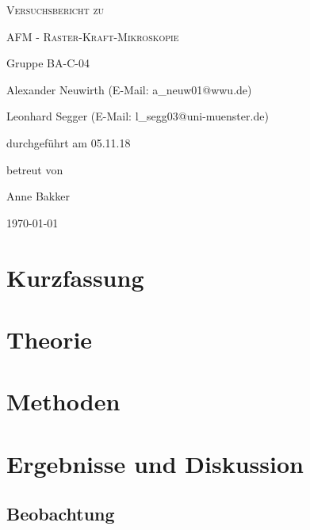 \documentclass[
	a4paper,
	12pt,
	pagesize,
	ngerman
]{scrartcl}
\begin{document}
	\begin{titlepage}
		\centering
		{\scshape\LARGE Versuchsbericht zu \par}
		\vspace{1cm}
		{\scshape\huge AFM - Raster-Kraft-Mikroskopie \par}
		\vspace{2.5cm}
		{\LARGE Gruppe BA-C-04 \par}
		\vspace{0.5cm}

		{\large Alexander Neuwirth (E-Mail: a\_neuw01@wwu.de) \par}
		{\large Leonhard Segger (E-Mail: l\_segg03@uni-muenster.de) \par}
		\vfill

		durchgeführt am 05.11.18\par
		betreut von\par
		{\large Anne Bakker}

		\vfill

		{\large \today\par}
	\end{titlepage}
	\tableofcontents
	\newpage


	\section{Kurzfassung}

	\section{Theorie}

	\section{Methoden}

	\section{Ergebnisse und Diskussion}


	\subsection{Beobachtung}
\end{document}
